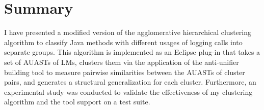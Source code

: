 \section{Summary} \label{meth2-summary}
I have presented a modified version of the agglomerative hierarchical clustering algorithm to classify Java methods with different usages of logging calls into separate groups. This algorithm is implemented as an Eclipse plug-in that takes a set of AUASTs of LMs, clusters them via the application of the anti-unifier building tool to measure pairwise similarities between the AUASTs of cluster pairs, and generates a structural generalization for each cluster. Furthermore, an experimental study was conducted to validate the effectiveness of my clustering algorithm and the tool support on a test suite.
